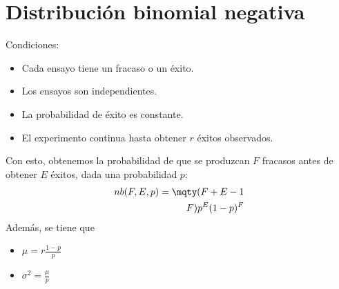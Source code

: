 \documentclass{./Probabilidad.tex}
\begin{document}
\section{Distribución binomial negativa}
Condiciones:
\begin{itemize}
	\item Cada ensayo tiene un fracaso o un éxito.
	\item Los ensayos son independientes.
	\item La probabilidad de éxito es constante.
	\item El experimento continua hasta obtener $r$ éxitos observados. 
\end{itemize}
Con esto, obtenemos la probabilidad de que se produzcan $F$ fracasos antes de obtener $E$ éxitos, dada una probabilidad $p$:
\begin{equation}
	\begin{split}
		nb(F,E,p) = \mqty(F+E-1\\F) p^{E}(1-p)^{F}
	\end{split}
\end{equation}
Además, se tiene que
\begin{itemize}
	\item $\mu = r \frac{1-p}{p}$
	\item $\sigma^{2} = \frac{\mu}{p}$ 
\end{itemize}
\end{document}
